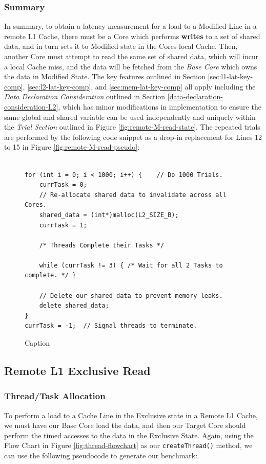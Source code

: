 \documentclass[bsc,frontabs,twoside,singlespacing,parskip,deptreport]{infthesis}     %
\begin{document}
\subsubsection{Summary}
In summary, to obtain a latency measurement for a load to a Modified Line in a remote L1 Cache, there must be a Core which performs \textbf{writes} to a set of shared data, and in turn sets it to Modified state in the Cores local Cache. Then, another Core must attempt to read the same set of shared data, which will incur a local Cache miss, and the data will be fetched from the \emph{Base Core} which owns the data in Modified State. The key features outlined in Section \ref{sec:l1-lat-key-comp}, \ref{sec:l2-lat-key-comp}, and \ref{sec:mem-lat-key-comp} all apply including the \textit{Data Declaration Consideration} outlined in Section \ref{data-declaration-consideration-L2}, which has minor modifications in implementation to ensure the same global and shared variable can be used independently and uniquely within the \textit{Trial Section} outlined in Figure \ref{fig:remote-M-read-state}. The repeated trials are performed by the following code snippet as a drop-in replacement for Lines 12 to 15 in Figure \ref{fig:remote-M-read-pseudo}:
\begin{figure}[!h]
    \centering
    \begin{minipage}{0.8\textwidth}
    \begin{verbatim}

for (int i = 0; i < 1000; i++) {    // Do 1000 Trials.
    currTask = 0;
    // Re-allocate shared data to invalidate across all Cores.
    shared_data = (int*)malloc(L2_SIZE_B);
    currTask = 1;

    /* Threads Complete their Tasks */
        
    while (currTask != 3) { /* Wait for all 2 Tasks to complete. */ }
    
    // Delete our shared data to prevent memory leaks.
    delete shared_data;
}
currTask = -1;  // Signal threads to terminate.
    \end{verbatim}
    \end{minipage}
    \caption{Caption}
    \label{fig:remote-M-repeat}
\end{figure}


\subsection{Remote L1 Exclusive Read}
\subsubsection{Thread/Task Allocation}
To perform a load to a Cache Line in the Exclusive state in a Remote L1 Cache, we must have our Base Core load the data, and then our Target Core should perform the timed accesses to the data in the Exclusive State. Again, using the Flow Chart in Figure \ref{fig:thread-flowchart} as our \texttt{createThread()} method, we can use the following pseudocode to generate our benchmark:
\end{document}
